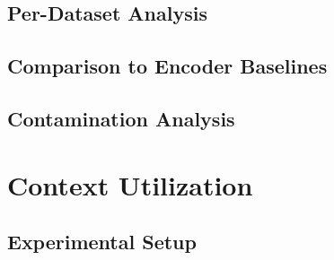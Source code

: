 \subsection{Per-Dataset Analysis}
\label{sec:zs_per_dataset}


\subsection{Comparison to Encoder Baselines}
\label{sec:zs_comparison}


\subsection{Contamination Analysis}
\label{sec:zs_contamination}



\section{Context Utilization}
\label{sec:context}


\subsection{Experimental Setup}
\label{sec:ctx_setup}


